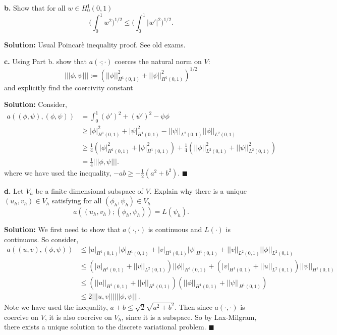 \documentclass[11pt]{article}
\begin{document}
\vskip 2cm


\textbf{b.} Show that for all $w \in H^1_0(0,1)$
\begin{equation}
    \Big( \int_0^1 w^2  \Big)^{1/2} \leq \Big( \int_0^1 |w'|^2 \Big)^{1/2}.
\end{equation}


\vskip 1cm


\textbf{Solution:} Usual Poincar\`{e} inequality proof.
See old exams.


\vskip 2cm

\textbf{c.} Using Part b. show that $a(\cdot;\cdot)$ coerces the natural norm on $V$:
\begin{equation}
    |||\phi, \psi||| := (||\phi||^2_{H^1(0,1)} + ||\psi||^2_{H^1(0,1)})^{1/2}
\end{equation}
and explicitly find the coercivity constant

\vskip 1cm

\textbf{Solution:} Consider,
\begin{align*}
    a((\phi, \psi), (\phi,\psi)) &= \int_0^1 (\phi')^2 + (\psi')^2 - \psi\phi \\
    &\geq |\phi|_{H^1(0,1)}^2 + |\psi|^2_{H^1(0,1)} - ||\psi||_{L^2(0,1)} ||\phi||_{L^2(0,1)} \\
    &\geq \frac{1}{4}( |\phi|_{H^1(0,1)}^2 + |\psi|^2_{H^1(0,1)} ) + \frac{1}{4}( ||\phi||_{L^2(0,1)}^2 + ||\psi||^2_{L^2(0,1)} ) \\
    &= \frac{1}{4} |||\phi,\psi|||.
\end{align*}
where we have used the inequality, $-ab \geq -\frac{1}{2}(a^2 + b^2)$.
$\blacksquare$


\vskip 2cm


\textbf{d.}  Let $V_h$ be a finite dimensional subspace of $V$.
Explain why there is a unique $(u_h,v_h) \in V_h$ satisfying for all $(\phi_h,\psi_h) \in V_h$ 
\begin{equation}
    a((u_h, v_h); (\phi_h, \psi_h)) = L(\psi_h).
\end{equation}


\vskip 1cm


\textbf{Solution:} We first need to show that $a(\cdot, \cdot)$ is continuous and $L(\cdot)$ is continuous.
So consider,
\begin{align*}
    a((u,v), (\phi, \psi)) &\leq |u|_{H^1(0,1)} |\phi|_{H^1(0,1)} + |v|_{H^1(0,1)} |\psi|_{H^1(0,1)}  + ||v||_{L^2(0,1)} ||\phi||_{L^2(0,1)} \\
    &\leq (|u|_{H^1(0,1)} + ||v||_{L^2(0,1)}) ||\phi||_{H^1(0,1)} + (|v|_{H^1(0,1)} + ||u||_{L^2(0,1)})||\psi||_{H^1(0,1)} \\
    &\leq (||u||_{H^1(0,1)} + ||v||_{H^1(0,1)})(||\phi||_{H^1(0,1)} + ||\psi||_{H^1(0,1)}) \\
    &\leq 2 |||u,v||| |||\phi, \psi|||.
\end{align*}
Note we have used the inequality, $a+b \leq \sqrt{2} \sqrt{a^2 + b^2}$.
Then since $a(\cdot, \cdot)$ is coercive on $V$, it is also coercive on $V_h$, since it is a subspace. 
So by Lax-Milgram, there exists a unique solution to the discrete variational problem.
$\blacksquare$
\end{document}
